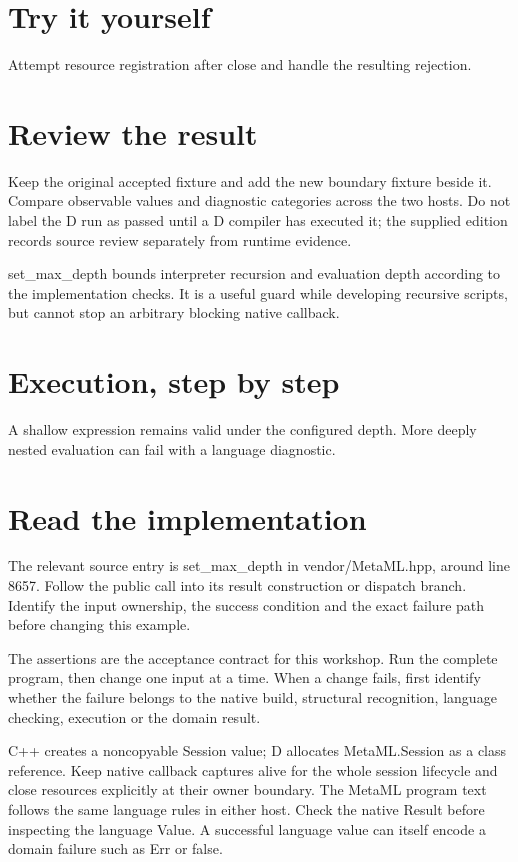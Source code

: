 \section*{Try it yourself}
Attempt resource registration after close and handle the resulting rejection.

\section*{Review the result}
Keep the original accepted fixture and add the new boundary fixture beside it. Compare observable values and diagnostic categories across the two hosts. Do not label the D run as passed until a D compiler has executed it; the supplied edition records source review separately from runtime evidence.

\clearpage
{}
set\_max\_depth bounds interpreter recursion and evaluation depth according to the implementation checks. It is a useful guard while developing recursive scripts, but cannot stop an arbitrary blocking native callback.


\section*{Execution, step by step}
A shallow expression remains valid under the configured depth. More deeply nested evaluation can fail with a language diagnostic.

\section*{Read the implementation}
The relevant source entry is set\_max\_depth in vendor/MetaML.hpp, around line 8657. Follow the public call into its result construction or dispatch branch. Identify the input ownership, the success condition and the exact failure path before changing this example.

The assertions are the acceptance contract for this workshop. Run the complete program, then change one input at a time. When a change fails, first identify whether the failure belongs to the native build, structural recognition, language checking, execution or the domain result.

\clearpage
{}
C++ creates a noncopyable Session value; D allocates MetaML.Session as a class reference. Keep native callback captures alive for the whole session lifecycle and close resources explicitly at their owner boundary. The MetaML program text follows the same language rules in either host. Check the native Result before inspecting the language Value. A successful language value can itself encode a domain failure such as Err or false.

